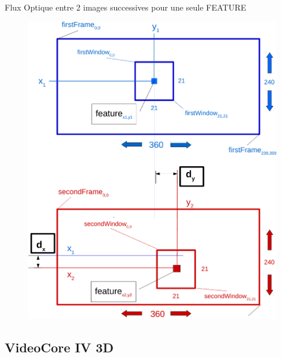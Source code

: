 \documentclass{bredelebeamer}
\begin{document}
\begin{frame}{Flux Optique entre 2 images successives pour une seule FEATURE }

\begin{figure}
\centering
\includegraphics[scale=0.3]{images/framesWindow.pdf}
\end{figure}

\end{frame}



\subsection{VideoCore IV 3D}

\end{document}

